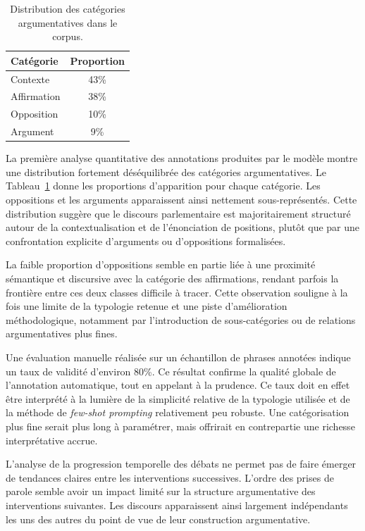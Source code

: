 \documentclass[final, fra]{anthology-ch}      %
\begin{document}
\begin{table}
\centering\vspace{-.5cm}
\begin{tabular}{lc}
\hline
Catégorie & Proportion \\ 
\hline
Contexte & 43\% \\
Affirmation & 38\% \\
Opposition & 10\% \\
Argument & 9\% \\
\hline
\end{tabular}
\caption{Distribution des catégories argumentatives dans le corpus.}
\label{tab:proportion}
\vspace{-.3cm}
\end{table}
La première analyse quantitative des annotations produites par le modèle montre une distribution fortement déséquilibrée des catégories argumentatives. Le Tableau~\ref{tab:proportion} donne les proportions d'apparition pour chaque catégorie. Les oppositions et les arguments apparaissent ainsi nettement sous-représentés. Cette distribution suggère que le discours parlementaire est majoritairement structuré autour de la contextualisation et de l’énonciation de positions, plutôt que par une confrontation explicite d’arguments ou d’oppositions formalisées.

La faible proportion d’oppositions semble en partie liée à une proximité sémantique et discursive avec la catégorie des affirmations, rendant parfois la frontière entre ces deux classes difficile à tracer. Cette observation souligne à la fois une limite de la typologie retenue et une piste d’amélioration méthodologique, notamment par l’introduction de sous-catégories ou de relations argumentatives plus fines.

Une évaluation manuelle réalisée sur un échantillon de phrases annotées indique un taux de validité d’environ 80\%. Ce résultat confirme la qualité globale de l’annotation automatique, tout en appelant à la prudence. Ce taux doit en effet être interprété à la lumière de la simplicité relative de la typologie utilisée et de la méthode de \textit{few-shot prompting} relativement peu robuste. Une catégorisation plus fine serait plus long à paramétrer, mais offrirait en contrepartie une richesse interprétative accrue.

L’analyse de la progression temporelle des débats ne permet pas de faire émerger de tendances claires entre les interventions successives. L’ordre des prises de parole semble avoir un impact limité sur la structure argumentative des interventions suivantes. Les discours apparaissent ainsi largement indépendants les uns des autres du point de vue de leur construction argumentative.
\end{document}

